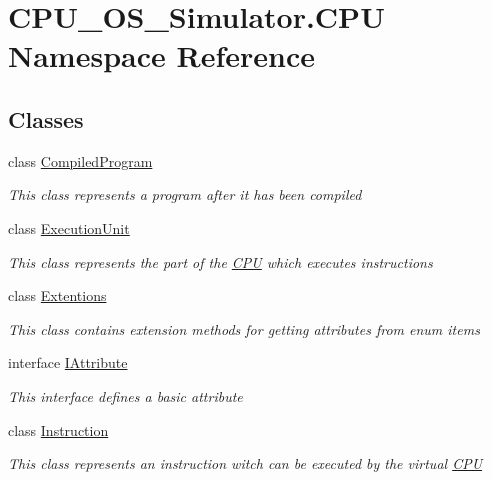 \hypertarget{namespace_c_p_u___o_s___simulator_1_1_c_p_u}{}\section{C\+P\+U\+\_\+\+O\+S\+\_\+\+Simulator.\+C\+P\+U Namespace Reference}
\label{namespace_c_p_u___o_s___simulator_1_1_c_p_u}
\subsection*{Classes}
\begin{DoxyCompactItemize}
\item 
class \hyperlink{class_c_p_u___o_s___simulator_1_1_c_p_u_1_1_compiled_program}{Compiled\+Program}
\begin{DoxyCompactList}\small\item\em This class represents a program after it has been compiled \end{DoxyCompactList}\item 
class \hyperlink{class_c_p_u___o_s___simulator_1_1_c_p_u_1_1_execution_unit}{Execution\+Unit}
\begin{DoxyCompactList}\small\item\em This class represents the part of the \hyperlink{namespace_c_p_u___o_s___simulator_1_1_c_p_u}{C\+P\+U} which executes instructions \end{DoxyCompactList}\item 
class \hyperlink{class_c_p_u___o_s___simulator_1_1_c_p_u_1_1_extentions}{Extentions}
\begin{DoxyCompactList}\small\item\em This class contains extension methods for getting attributes from enum items \end{DoxyCompactList}\item 
interface \hyperlink{interface_c_p_u___o_s___simulator_1_1_c_p_u_1_1_i_attribute}{I\+Attribute}
\begin{DoxyCompactList}\small\item\em This interface defines a basic attribute \end{DoxyCompactList}\item 
class \hyperlink{class_c_p_u___o_s___simulator_1_1_c_p_u_1_1_instruction}{Instruction}
\begin{DoxyCompactList}\small\item\em This class represents an instruction witch can be executed by the virtual \hyperlink{namespace_c_p_u___o_s___simulator_1_1_c_p_u}{C\+P\+U} \end{DoxyCompactList}\item 

\end{DoxyCompactItemize}

